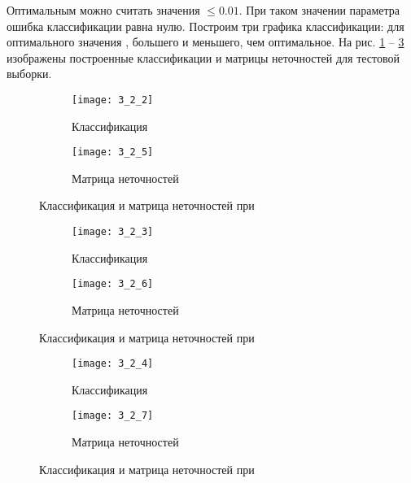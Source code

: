 Оптимальным можно считать значения  $\leq 0.01$. При таком значении параметра ошибка классификации равна нулю. Построим три графика классификации: для оптимального значения , большего и меньшего, чем оптимальное. На рис. \ref{fig:3_2_2} -- \ref{fig:3_2_4} изображены построенные классификации и матрицы неточностей для тестовой выборки.
\begin{figure}[H]
\begin{center}
	\begin{subfigure}{0.49\textwidth}
		\texttt{[image: 3\_2\_2]}
		\caption{Классификация}
	\end{subfigure}
	\begin{subfigure}{0.49\textwidth}
		\texttt{[image: 3\_2\_5]}
		\caption{Матрица неточностей}
	\end{subfigure}
	\caption{Классификация и матрица неточностей при }
	\label{fig:3_2_2}
\end{center}
\end{figure}

\begin{figure}[H]
\begin{center}
	\begin{subfigure}{0.49\textwidth}
		\texttt{[image: 3\_2\_3]}
		\caption{Классификация}
	\end{subfigure}
	\begin{subfigure}{0.49\textwidth}
		\texttt{[image: 3\_2\_6]}
		\caption{Матрица неточностей}
	\end{subfigure}
	\caption{Классификация и матрица неточностей при }
	\label{fig:3_2_3}
\end{center}
\end{figure}


\begin{figure}[H]
\begin{center}
	\begin{subfigure}{0.49\textwidth}
		\texttt{[image: 3\_2\_4]}
		\caption{Классификация}
	\end{subfigure}
	\begin{subfigure}{0.49\textwidth}
		\texttt{[image: 3\_2\_7]}
		\caption{Матрица неточностей}
	\end{subfigure}
	\caption{Классификация и матрица неточностей при }
	\label{fig:3_2_4}
\end{center}
\end{figure}


